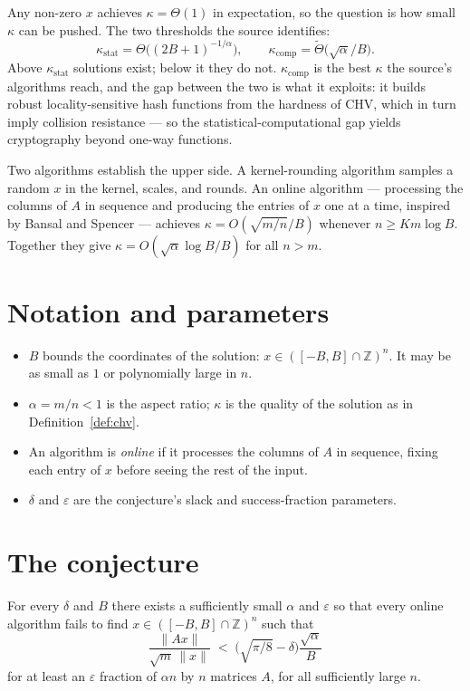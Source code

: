 \documentclass{conjura-conjecture}
\newcommand{\eps}{\varepsilon}
\newcommand{\Z}{\mathbb{Z}}
\newcommand{\CHV}{\mathrm{CHV}}
\begin{document}
Any non-zero $x$ achieves $\kappa = \Theta(1)$ in expectation, so the
question is how small $\kappa$ can be pushed. The two thresholds the
source identifies:
\[
  \kappa_{\mathrm{stat}} = \Theta\bigl((2B+1)^{-1/\alpha}\bigr),
  \qquad
  \kappa_{\mathrm{comp}} = \tilde{\Theta}\bigl(\sqrt{\alpha}/B\bigr).
\]
Above $\kappa_{\mathrm{stat}}$ solutions exist; below it they do not.
$\kappa_{\mathrm{comp}}$ is the best $\kappa$ the source's algorithms
reach, and the gap between the two is what it exploits: it builds robust
locality-sensitive hash functions from the hardness of $\CHV$, which in
turn imply collision resistance --- so the statistical-computational gap
yields cryptography beyond one-way functions.

Two algorithms establish the upper side. A kernel-rounding algorithm
samples a random $x$ in the kernel, scales, and rounds. An online
algorithm --- processing the columns of $A$ in sequence and producing the
entries of $x$ one at a time, inspired by Bansal and Spencer --- achieves
$\kappa = O(\sqrt{m/n}/B)$ whenever $n \ge Km\log B$. Together they give
$\kappa = O(\sqrt{\alpha}\log B/B)$ for all $n > m$.

\section{Notation and parameters}\label{sec:notation}

\begin{itemize}[nosep]
  \item $B$ bounds the coordinates of the solution: $x \in ([-B,B] \cap
    \Z)^{n}$. It may be as small as $1$ or polynomially large in $n$.
  \item $\alpha = m/n < 1$ is the aspect ratio; $\kappa$ is the quality
    of the solution as in Definition~\ref{def:chv}.
  \item An algorithm is \emph{online} if it processes the columns of $A$
    in sequence, fixing each entry of $x$ before seeing the rest of the
    input.
  \item $\delta$ and $\eps$ are the conjecture's slack and
    success-fraction parameters.
\end{itemize}

\section{The conjecture}\label{sec:conjectures}

\begin{conjecture}\label{conj:main}
For every $\delta$ and $B$ there exists a sufficiently small $\alpha$ and
$\eps$ so that every online algorithm fails to find $x \in ([-B,B] \cap
\Z)^{n}$ such that
\[
  \frac{\|Ax\|}{\sqrt{m}\,\|x\|} \;<\; \bigl(\sqrt{\pi/8} -
  \delta\bigr)\frac{\sqrt{\alpha}}{B}
\]
for at least an $\eps$ fraction of $\alpha n$ by $n$ matrices $A$, for
all sufficiently large $n$.
\end{conjecture}
\end{document}

